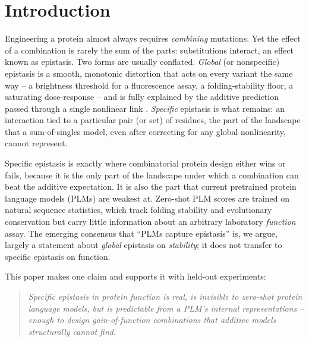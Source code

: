 \documentclass{article}
\begin{document}
\section{Introduction}
\label{sec:intro}

Engineering a protein almost always requires \emph{combining} mutations.
Yet the effect of a combination is rarely the sum of the parts: substitutions
interact, an effect known as epistasis. Two forms are usually conflated.
\emph{Global} (or nonspecific) epistasis is a smooth, monotonic distortion that
acts on every variant the same way -- a brightness threshold for a fluorescence
assay, a folding-stability floor, a saturating dose-response -- and is fully
explained by the additive prediction passed through a single nonlinear link
\citep{otwinowski2018inferring,sailer2017detecting}. \emph{Specific} epistasis
is what remains: an interaction tied to a particular pair (or set) of residues,
the part of the landscape that a sum-of-singles model, even after correcting for
any global nonlinearity, cannot represent.

Specific epistasis is exactly where combinatorial protein design either wins or
fails, because it is the only part of the landscape under which a combination can
beat the additive expectation. It is also the part that current pretrained
protein language models (PLMs) are weakest at. Zero-shot PLM scores
\citep{meier2021language,wang2024dplm} are trained on natural sequence
statistics, which track folding stability and evolutionary conservation but carry
little information about an arbitrary laboratory \emph{function} assay. The
emerging consensus that ``PLMs capture epistasis'' is, we argue, largely a
statement about \emph{global} epistasis on \emph{stability}; it does not transfer
to specific epistasis on function.

This paper makes one claim and supports it with held-out experiments:

\begin{quote}
\emph{Specific epistasis in protein function is real, is invisible to zero-shot
protein language models, but is predictable from a PLM's internal
representations -- enough to design gain-of-function combinations that additive
models structurally cannot find.}
\end{quote}
\end{document}
